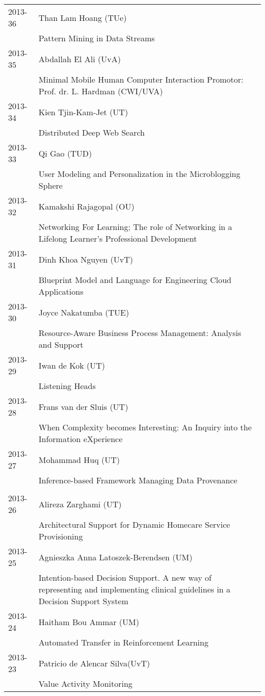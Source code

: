 \begin{longtable}{p{1.25cm}p{10.75cm}}
2013-36 & Than Lam Hoang (TUe) \\& Pattern Mining in Data Streams \\
2013-35 & Abdallah El Ali (UvA) \\& Minimal Mobile Human Computer Interaction \newline Promotor: Prof. dr. L. Hardman (CWI/UVA) \\
2013-34 & Kien Tjin-Kam-Jet (UT) \\& Distributed Deep Web Search \\
2013-33 & Qi Gao (TUD) \\& User Modeling and Personalization in the Microblogging Sphere \\
2013-32 & Kamakshi Rajagopal (OU) \\& Networking For Learning; The role of Networking in a Lifelong Learner's Professional Development \\
2013-31 & Dinh Khoa Nguyen (UvT) \\& Blueprint Model and Language for Engineering Cloud Applications \\
2013-30 & Joyce Nakatumba (TUE) \\& Resource-Aware Business Process Management: Analysis and Support \\
2013-29 & Iwan de Kok (UT) \\& Listening Heads \\
2013-28 & Frans van der Sluis (UT) \\& When Complexity becomes Interesting: An Inquiry into the Information eXperience \\
2013-27 & Mohammad Huq (UT) \\& Inference-based Framework Managing Data Provenance \\
\\
2013-26 & Alireza Zarghami (UT) \\& Architectural Support for Dynamic Homecare Service Provisioning \\
2013-25 & Agnieszka Anna Latoszek-Berendsen (UM) \\& Intention-based Decision Support. A new way of representing and \newline implementing clinical guidelines in a Decision Support System \\
2013-24 & Haitham Bou Ammar (UM) \\& Automated Transfer in Reinforcement Learning \\
2013-23 & Patricio de Alencar Silva(UvT) \\& Value Activity Monitoring \\

\end{longtable}
